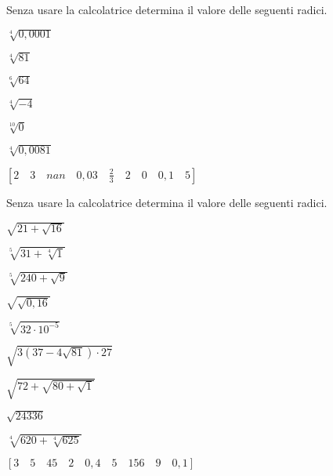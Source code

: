 \begin{esercizio}
 \label{ese:2.08}
Senza usare la calcolatrice determina il valore delle seguenti radici.
\vspace{-.7em}
 \begin{multicols}{3}
 \begin{enumeratea}
 \item \(\sqrt[4]{0,0001}\)
 \item \(\sqrt[4]{81}\)
 \item \(\sqrt[6]{64}\)
 \item \(\sqrt[4]{-4}\)
 \item \(\sqrt[10]0\)
 \item \(\sqrt[4]{0,0081}\)
 \end{enumeratea}
 \end{multicols}
\begin{flushright}
\vspace*{-8pt}
\([2 \quad 3 \quad nan \quad 0,03 \quad \frac{2}{3} \quad 2 \quad 0 
\quad 0,1 \quad 5]\)
\end{flushright}
\end{esercizio}
\vspace{-1.0em}

\begin{esercizio}[\Ast]
\label{ese:2.09}
Senza usare la calcolatrice determina il valore delle seguenti radici.
\vspace{-.7em}
 \begin{multicols}{3}
 \begin{enumeratea}
 \item \(\sqrt{21+\sqrt{16}}\)
 \item \(\sqrt[5]{31+\sqrt[4]1}\)
 \item \(\sqrt[5]{240+\sqrt 9}\)
 \item \(\sqrt{\sqrt{0,16}}\)
 \item \(\sqrt[5]{32\cdot 10^{-5}}\)
 \item \(\sqrt{3 (37-4\sqrt{81})\cdot 27}\)
 \item \(\sqrt{72+\sqrt{80+\sqrt 1}}\)
 \item \(\sqrt{24336}\)
 \item \(\sqrt[4]{620+\sqrt[4]{625}}\)
 \end{enumeratea}
 \end{multicols}
\begin{flushright}
\vspace*{-8pt}
\([3 \quad 5 \quad 45 \quad 2 \quad 0,4 \quad 5 \quad 156 \quad 9 \quad 0,1]\)
\end{flushright}
\end{esercizio}

